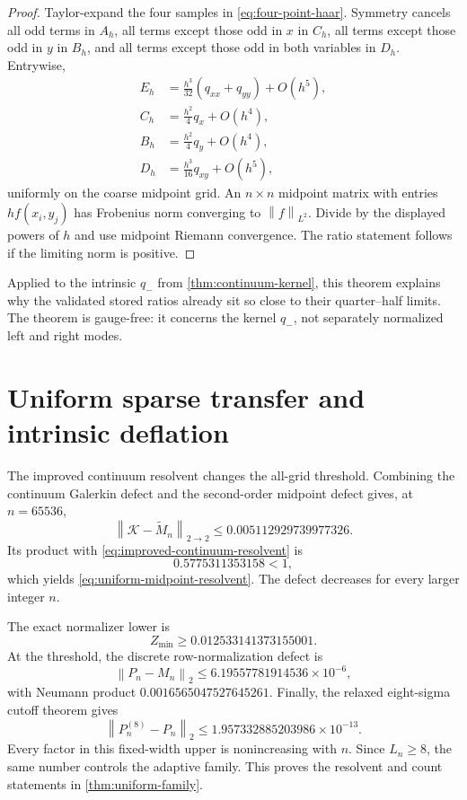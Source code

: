 \documentclass[11pt]{article}
\theoremstyle{definition}
\theoremstyle{remark}
\newcommand{\cK}{\mathcal K}
\newcommand{\norm}[1]{\left\lVert #1\right\rVert}
\begin{document}
\begin{proof}
Taylor-expand the four samples in \eqref{eq:four-point-haar}.  Symmetry
cancels all odd terms in $A_h$, all terms except those odd in $x$ in $C_h$,
all terms except those odd in $y$ in $B_h$, and all terms except those odd in
both variables in $D_h$.  Entrywise,
\begin{align*}
 E_h&=\frac{h^3}{32}(q_{xx}+q_{yy})+O(h^5),\\
 C_h&=\frac{h^2}{4}q_x+O(h^4),\\
 B_h&=\frac{h^2}{4}q_y+O(h^4),\\
 D_h&=\frac{h^3}{16}q_{xy}+O(h^5),
\end{align*}
uniformly on the coarse midpoint grid.  An $n\times n$ midpoint matrix
with entries $h f(x_i,y_j)$ has Frobenius norm converging to
$\norm f_{L^2}$.  Divide by the displayed powers of $h$ and use midpoint
Riemann convergence.  The ratio statement follows if the limiting norm is
positive.
\end{proof}

Applied to the intrinsic $q_-$ from \cref{thm:continuum-kernel}, this theorem
explains why the validated stored ratios already sit so close to their
quarter--half limits.  The theorem is gauge-free: it concerns the kernel
$q_-$, not separately normalized left and right modes.

\section{Uniform sparse transfer and intrinsic deflation}
\label{sec:deflation}

The improved continuum resolvent changes the all-grid threshold.  Combining
the continuum Galerkin defect and the second-order midpoint defect gives,
at $n=65536$,
\[
 \norm{\cK-\widetilde M_n}_{2\to2}
 \le0.005112929739977326.
\]
Its product with \eqref{eq:improved-continuum-resolvent} is
\[
 0.5775311353158<1,
\]
which yields \eqref{eq:uniform-midpoint-resolvent}.  The defect decreases
for every larger integer $n$.

The exact normalizer lower is
\[
 Z_{\min}\ge0.012533141373155001.
\]
At the threshold, the discrete row-normalization defect is
\[
 \norm{P_n-M_n}_2\le6.19557781914536\times10^{-6},
\]
with Neumann product $0.0016565047527645261$.  Finally, the relaxed
eight-sigma cutoff theorem gives
\[
 \norm{P_n^{(8)}-P_n}_2
 \le1.957332885203986\times10^{-13}.
\]
Every factor in this fixed-width upper is nonincreasing with $n$.  Since
$L_n\ge8$, the same number controls the adaptive family.  This proves the
resolvent and count statements in \cref{thm:uniform-family}.
\end{document}
